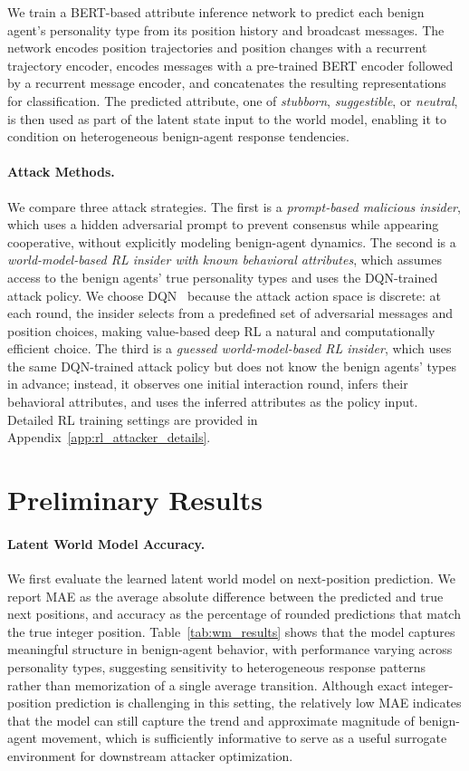 \documentclass{article}
\theoremstyle{plain}
\theoremstyle{definition}
\theoremstyle{remark}
\begin{document}
We train a BERT-based attribute inference network to predict each benign agent's personality type from its position history and broadcast messages. The network encodes position trajectories and position changes with a recurrent trajectory encoder, encodes messages with a pre-trained BERT encoder followed by a recurrent message encoder, and concatenates the resulting representations for classification. The predicted attribute, one of \textit{stubborn}, \textit{suggestible}, or \textit{neutral}, is then used as part of the latent state input to the world model, enabling it to condition on heterogeneous benign-agent response tendencies.

\paragraph{Attack Methods.} We compare three attack strategies. The first is a \emph{prompt-based malicious insider}, which uses a hidden adversarial prompt to prevent consensus while appearing cooperative, without explicitly modeling benign-agent dynamics. The second is a \emph{world-model-based RL insider with known behavioral attributes}, which assumes access to the benign agents' true personality types and uses the DQN-trained attack policy. We choose DQN~\citep{mnih2015human} because the attack action space is discrete: at each round, the insider selects from a predefined set of adversarial messages and position choices, making value-based deep RL a natural and computationally efficient choice. The third is a \emph{guessed world-model-based RL insider}, which uses the same DQN-trained attack policy but does not know the benign agents' types in advance; instead, it observes one initial interaction round, infers their behavioral attributes, and uses the inferred attributes as the policy input. Detailed RL training settings are provided in Appendix~\ref{app:rl_attacker_details}.

\section{Preliminary Results}
\paragraph{Latent World Model Accuracy.}
We first evaluate the learned latent world model on next-position prediction. We report MAE as the average absolute difference between the predicted and true next positions, and accuracy as the percentage of rounded predictions that match the true integer position. Table~\ref{tab:wm_results} shows that the model captures meaningful structure in benign-agent behavior, with performance varying across personality types, suggesting sensitivity to heterogeneous response patterns rather than memorization of a single average transition. Although exact integer-position prediction is challenging in this setting, the relatively low MAE indicates that the model can still capture the trend and approximate magnitude of benign-agent movement, which is sufficiently informative to serve as a useful surrogate environment for downstream attacker optimization.
\end{document}
